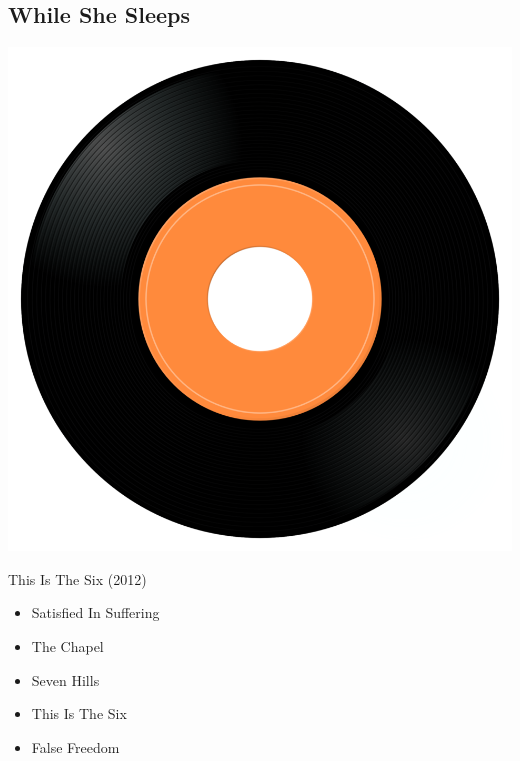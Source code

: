 \subsection{While She Sleeps}

\begin{minipage}[t]{0.25\textwidth}
\captionsetup{type=figure}
\includegraphics[width=\textwidth]{Images/cover.png}
\caption*{This Is The Six (2012)}
\end{minipage}
\begin{minipage}[t]{0.25\textwidth}\vspace{0pt}
\begin{itemize}[nosep,leftmargin=1em,labelwidth=*,align=left]
	\setlength{\itemsep}{0pt}
	\item Satisfied In Suffering
	\item The Chapel
	\item Seven Hills
	\item This Is The Six
	\item False Freedom
\end{itemize}
\end{minipage}
